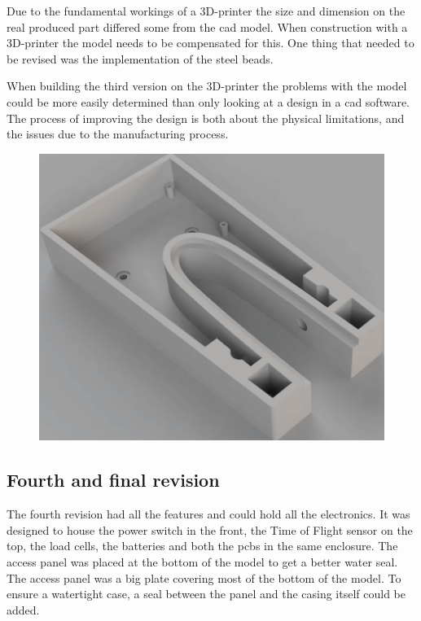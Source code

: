 Due to the fundamental workings of a 3D-printer the size and dimension on the real produced part differed some from the \gls{cad} model. When construction with a 3D-printer the model needs to be compensated for this. One thing that needed to be revised was the implementation of the steel beads.

When building the third version on the 3D-printer the problems with the model could be more easily determined than only looking at a design in a \gls{cad} software. The process of improving the design is both about the physical limitations, and the issues due to the manufacturing process.
\begin{figure}[H]
\begin{center}
	\includegraphics[width = .8\textwidth]{Figures/Case_rev_3.png}
	\label{Case_rev_3}
\end{center}
\end{figure}

\subsection{Fourth and final  revision}
The fourth revision had all the features and could hold all the electronics. It was designed to house the power switch in the front, the Time of Flight sensor on the top, the load cells, the batteries and both the \gls{pcb}s in the same enclosure. The access panel was placed at the bottom of the model to get a better water seal. The access panel was a big plate covering most of the bottom of the model. To ensure a watertight case, a seal between the panel and the casing itself could be added. 

